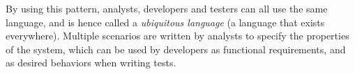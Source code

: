 By using this pattern, analysts, developers and testers can all use the
same language, and is hence called a \emph{ubiquitous language} (a
language that exists everywhere). Multiple scenarios are written by
analysts to specify the properties of the system, which can be used by
developers as functional requirements, and as desired behaviors when
writing tests.\\
